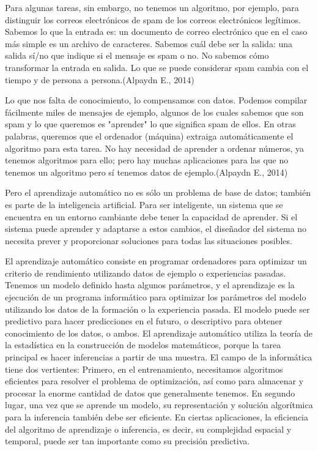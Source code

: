 Para algunas tareas, sin embargo, no tenemos un algoritmo, por ejemplo, para distinguir los correos electrónicos de spam de los correos electrónicos legítimos.  Sabemos lo que la entrada es: un documento de correo electrónico que en el caso más simple es un archivo de caracteres.  Sabemos cuál debe ser la salida: una salida sí/no que indique si el mensaje es spam o no.  No sabemos cómo transformar la entrada en salida.  Lo que se puede considerar spam cambia con el tiempo y de persona a persona.(Alpaydn E., 2014)

Lo que nos falta de conocimiento, lo compensamos con datos.   Podemos compilar fácilmente miles de mensajes de ejemplo, algunos de los cuales sabemos que son spam y lo que queremos es "aprender" lo que significa spam de ellos. En otras palabras, queremos que el ordenador (máquina) extraiga automáticamente el algoritmo para esta tarea.  No hay necesidad de aprender a ordenar números, ya tenemos algoritmos para ello; pero hay muchas aplicaciones para las que no tenemos un algoritmo pero sí tenemos datos de ejemplo.(Alpaydn E., 2014)

Pero el aprendizaje automático no es sólo un problema de base de datos; también es parte de la inteligencia artificial.  Para ser inteligente, un sistema que se encuentra en un entorno cambiante debe tener la capacidad de aprender. Si el sistema puede aprender y adaptarse a estos cambios, el diseñador del sistema no necesita prever y proporcionar soluciones para todas las situaciones posibles.

El aprendizaje automático consiste en programar ordenadores para optimizar un criterio de rendimiento utilizando datos de ejemplo o experiencias pasadas. Tenemos un modelo definido hasta algunos parámetros, y el aprendizaje es la ejecución de un programa informático para optimizar los parámetros del modelo utilizando los datos de la formación o la experiencia pasada. El modelo puede ser predictivo para hacer predicciones en el futuro, o descriptivo para obtener conocimiento de los datos, o ambos. El aprendizaje automático utiliza la teoría de la estadística en la construcción de modelos matemáticos, porque la tarea principal es hacer inferencias a partir de una muestra.  El campo de la informática tiene dos vertientes:  Primero, en el entrenamiento, necesitamos algoritmos eficientes para resolver el problema de optimización, así como para almacenar y procesar la enorme cantidad de datos que generalmente tenemos. En segundo lugar, una vez que se aprende un modelo, su representación y solución algorítmica para la inferencia también debe ser eficiente. En ciertas aplicaciones, la eficiencia del algoritmo de aprendizaje o inferencia, es decir, su complejidad espacial y temporal, puede ser tan importante como su precisión predictiva.

